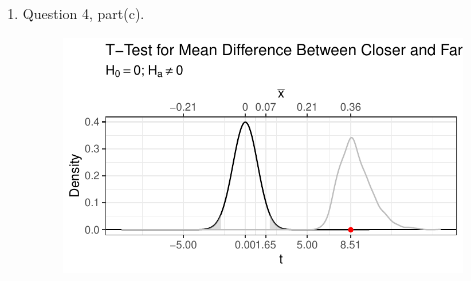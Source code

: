 \documentclass{article}\usepackage[]{graphicx}\usepackage[]{xcolor}
\begin{document}
\begin{enumerate}
\begin{enumerate}
\begin{figure}[H]
\begin{center}
    \caption{}
    \label{moe}
  \end{center}
\end{figure}
  \item Question 4, part(c).
     \begin{figure}[H]
  \begin{center}
    \includegraphics[scale=0.5]{diffg.pdf}
    \caption{}
    \label{moe}
  \end{center}
\end{figure}
\end{enumerate}
\end{enumerate}



\end{document}
